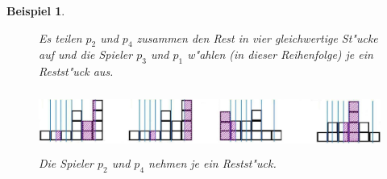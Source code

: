 \documentclass[11pt, a4paper, twoside]{article}
\newtheorem{bsp}[satz]{Beispiel}
\numberwithin{equation}{section}
\begin{document}
\begin{bsp}
\begin{figure}[h!]
\caption[Beispiel zum Brams,Taylors \& Zwickers Moving-Knife-Protokoll 4/5]{Es teilen $p_2$ und $p_4$ zusammen den Rest in vier gleichwertige St"ucke auf und die Spieler $p_3$ und $p_1$ w"ahlen (in dieser Reihenfolge) je ein Restst"uck aus.}
\end{figure}
\begin{figure}[h!]
\includegraphics[height=2cm]{btz8.jpg}
\caption[Beispiel zum Brams,Taylors \& Zwickers Moving-Knife-Protokoll 5/5]{Die Spieler $p_2$ und $p_4$ nehmen je ein Restst"uck.}
\end{figure}
\end{bsp}
\end{document}
